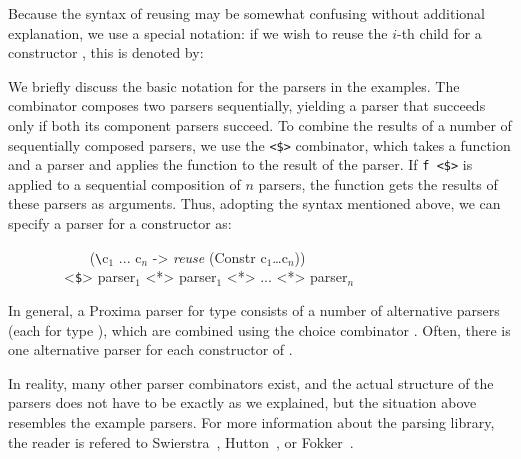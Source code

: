 Because the syntax of reusing may be somewhat confusing without additional explanation, we use a special notation: if we wish to reuse the $i$-th child for a constructor , this is denoted by:

\begin{small}\end{small}

We briefly discuss the basic notation for the parsers in the examples.  The \p{<*>} combinator composes two parsers sequentially, yielding a parser that succeeds only if both its component parsers succeed. To combine the results of a number of sequentially composed parsers, we use the \verb|<$>|
combinator, which takes a function and a parser and applies the function to the result of the parser. If \verb|f <$>| is applied to a sequential composition of $n$ parsers, the function  gets the results of these parsers as arguments. Thus, adopting the  syntax mentioned above, we can specify a parser for a constructor  as:


\ttfamily\begin{small}\begin{tabbing}
~~~~~~~~~~~ (\verb|\|c$_1$ ... c$_{n}$ -> {\em reuse} (Constr c$_1$\dots c$_{n}$))\\
~~~~~~~~<\verb|$|> parser$_{1}$ <*> parser$_{1}$ <*> ... <*> parser$_{n}$ \\
\end{tabbing}\end{small}\rmfamily

In general, a Proxima parser for type  consists of a number of alternative parsers (each for type ), which are combined using the choice combinator \p{<|>}. Often, there is one alternative parser for each constructor of . 

In reality, many other parser combinators exist, and the actual structure of the parsers does not have to be exactly as we explained, but the situation above resembles the example parsers. For more information about the parsing library, the reader is refered to Swierstra~\cite{swierstra01parsers}, Hutton~\cite{hutton92parsers}, or Fokker~\cite{ fokker95parsers}.



